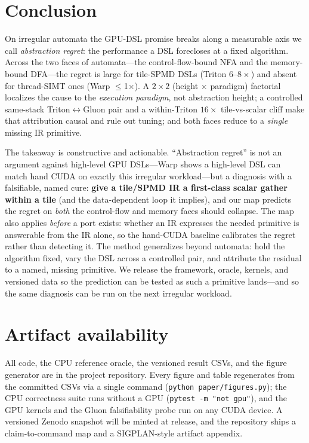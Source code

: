 \documentclass[conference]{IEEEtran}
\begin{document}
\section{Conclusion}
On irregular automata the GPU-DSL promise breaks along a measurable axis we call
\emph{abstraction regret}: the performance a DSL forecloses at a fixed algorithm. Across the two
faces of automata---the control-flow-bound NFA and the memory-bound DFA---the regret is large for
tile-SPMD DSLs (Triton $6$--$8\times$) and absent for thread-SIMT ones (Warp $\le$1$\times$). A
$2\times2$ (height $\times$ paradigm) factorial localizes the cause to the \emph{execution
paradigm}, not abstraction height; a controlled same-stack Triton$\leftrightarrow$Gluon pair and a
within-Triton $16\times$ tile-vs-scalar cliff make that attribution causal and rule out tuning; and
both faces reduce to a \emph{single} missing IR primitive.

The takeaway is constructive and actionable. ``Abstraction regret'' is not an argument against
high-level GPU DSLs---Warp shows a high-level DSL can match hand CUDA on exactly this irregular
workload---but a diagnosis with a falsifiable, named cure: \textbf{give a tile/SPMD IR a
first-class scalar gather within a tile} (and the data-dependent loop it implies), and our map
predicts the regret on \emph{both} the control-flow and memory faces should collapse.
The map also applies \emph{before} a port exists: whether an IR expresses the needed primitive is
answerable from the IR alone, so the hand-CUDA baseline calibrates the regret rather than detecting
it. The method
generalizes beyond automata: hold the algorithm fixed, vary the DSL across a controlled pair, and
attribute the residual to a named, missing primitive. We release the framework, oracle, kernels,
and versioned data so the prediction can be tested as such a primitive lands---and so the same
diagnosis can be run on the next irregular workload.

\section*{Artifact availability}
All code, the CPU reference oracle, the versioned result CSVs, and the figure generator are
in the project repository. Every figure and table regenerates from the committed CSVs via a
single command (\texttt{python paper/figures.py}); the CPU correctness suite runs without a
GPU (\texttt{pytest -m "not gpu"}), and the GPU kernels and the Gluon falsifiability probe run
on any CUDA device. A versioned Zenodo snapshot will be minted at release, and the repository
ships a claim-to-command map and a SIGPLAN-style artifact appendix.
\end{document}
